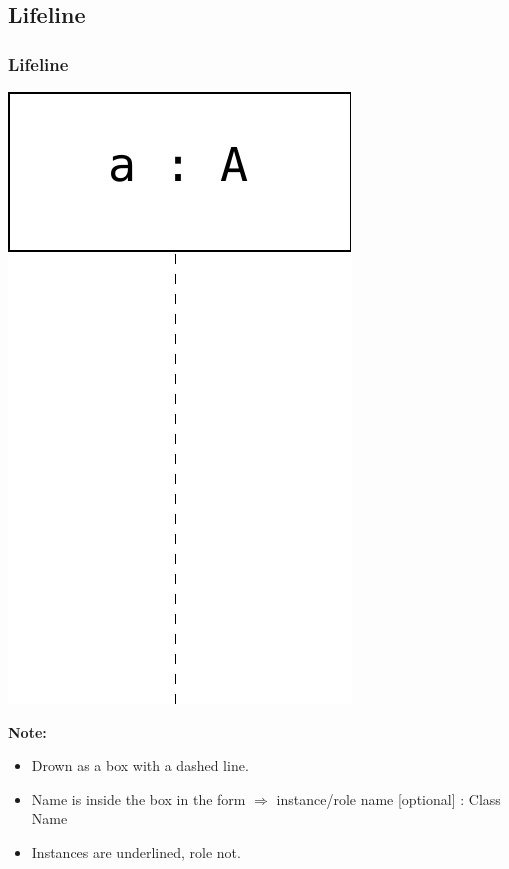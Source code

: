 \documentclass{beamer}
\begin{document}
\subsection{Lifeline}
\begin{frame}
	\frametitle{Lifeline}
	\begin{center}
		\includegraphics[scale=0.4]{box}
	\end{center}
	\textbf{Note:}
	\begin{itemize}
  			\item Drown as a box with a dashed line.
  			\item Name is inside the box in the form $\Rightarrow$ instance/role name [optional] : Class Name
  			\item Instances are underlined, role not.
	\end{itemize}
\end{frame}
\end{document}
